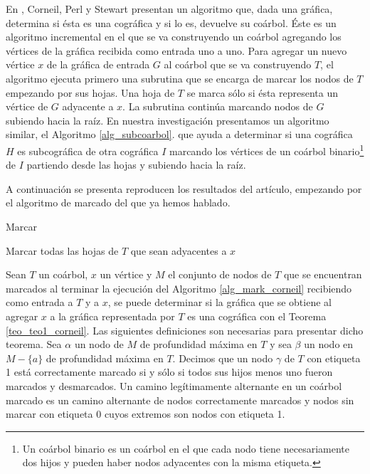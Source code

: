 En \cite{Corneil02}, Corneil, Perl y Stewart presentan un algoritmo que, 
dada una gráfica, determina si ésta es una cográfica y si lo es, devuelve
su coárbol. Éste es un algoritmo incremental en el que se va construyendo 
un coárbol agregando los vértices de la gráfica recibida como entrada uno 
a uno. Para agregar un nuevo vértice $x$ de la gráfica de entrada $G$ al 
coárbol que se va construyendo $T$, el algoritmo ejecuta primero una 
subrutina que se encarga de marcar los nodos de $T$ empezando por sus 
hojas. Una hoja de $T$ se marca sólo si ésta representa un vértice de $G$ 
adyacente a $x$. La subrutina continúa marcando nodos de $G$ subiendo hacia
la raíz. En nuestra investigación presentamos un algoritmo similar, el 
Algoritmo \ref{alg_subcoarbol}. que ayuda a determinar si una cográfica 
$H$ es subcográfica de otra cográfica $I$ marcando los vértices de un 
coárbol binario\footnote{Un coárbol binario es un coárbol en el que cada 
nodo tiene necesariamente dos hijos y pueden haber nodos adyacentes con la 
misma etiqueta.} de $I$ partiendo desde las hojas y subiendo hacia la raíz.

A continuación se presenta reproducen los resultados del artículo, empezando por el algoritmo de marcado del que ya hemos hablado. 

\begin{algorithm}[!htbp]
\caption{Marcar}
\label{alg_mark_corneil}
\DontPrintSemicolon %
Marcar todas las hojas de $T$ que sean adyacentes a $x$\;


\end{algorithm}

Sean $T$ un coárbol, $x$ un vértice y $M$ el conjunto de nodos de $T$ que se encuentran marcados al terminar la ejecución del Algoritmo \ref{alg_mark_corneil} recibiendo como entrada a $T$ y a $x$, se puede determinar
si la gráfica que se obtiene al agregar $x$ a la gráfica representada por
$T$ es una cográfica con el Teorema \ref{teo_teo1_corneil}. 
Las siguientes definiciones son necesarias para presentar dicho teorema. Sea $\alpha$ un
nodo de $M$ de profundidad máxima en $T$ y sea $\beta$ un nodo en $M-\{a\}$
de profundidad máxima en $T$. Decimos que un nodo $\gamma$ de $T$ con
etiqueta 1 está correctamente marcado si y sólo si todos sus hijos menos uno
fueron marcados y desmarcados. Un camino legítimamente alternante en un
coárbol marcado es un camino alternante de nodos correctamente marcados y
nodos sin marcar con etiqueta 0 cuyos extremos son nodos con etiqueta 1.


